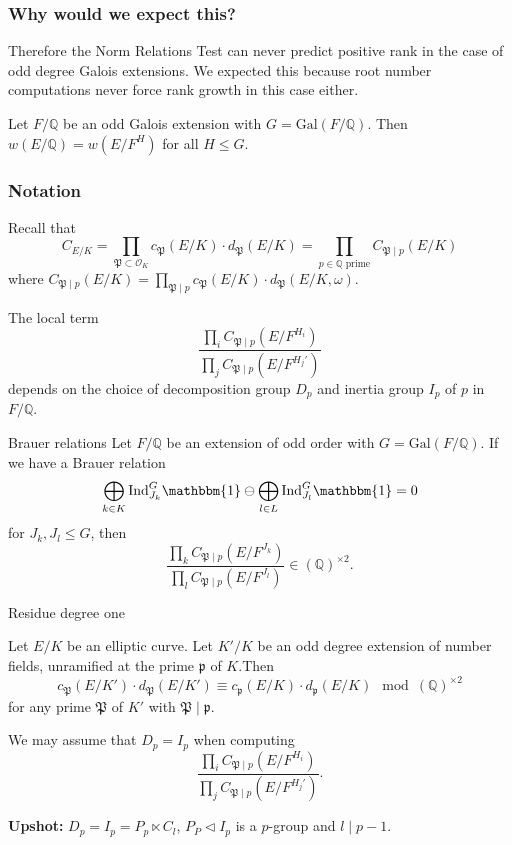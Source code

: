 \documentclass{beamer}
\newcommand{\Gal}{\mathrm{Gal}}
\newcommand{\trivial}{\mathbbm{1}}
\newcommand{\Ind}{\mathrm{Ind}}
\newcommand{\bQ}{\mathbb{Q}}
\newcommand{\fP}{\mathfrak{P}}
\newcommand{\fp}{\mathfrak{p}}
\newcommand{\cO}{\mathcal{O}}
\theoremstyle{plain}
\begin{document}
\begin{frame}
    \frametitle{Why would we expect this?}
        Therefore the Norm Relations Test can never predict positive rank in the case of odd degree Galois extensions. \pause We expected this because root number computations never force rank growth in this case either. \pause
        \begin{lemma}\label{lem_oddroot}
            Let $F / \bQ$ be an odd Galois extension with $G = \Gal(F / \bQ)$. Then $w(E / \bQ) = w(E / F^H)$ for all $H \leq G$. 
        \end{lemma}

\end{frame}

\begin{frame}
    \frametitle{Notation}
    Recall that 
    $$ C_{E / K} = \prod_{\fP \subset \cO_K} 
    c_{\fP}(E / K) \cdot d_{\fP}(E / K) = \prod_{p \in \bQ \text{ prime}} C_{\fP \mid p}(E / K)
    $$
    where $C_{\fP \mid p}(E / K) = \prod_{\fP \mid p} c_{\fP}(E / K) \cdot d_{\fP}(E / K, \omega)$.\pause 

    The local term $$\frac{\prod_i C_{\fP \mid p}(E / F^{H_i})}{\prod_j C_{\fP \mid p}(E / F^{H_j'})}$$ 
    depends on the choice of decomposition group $D_{p}$ and inertia group $I_{p}$ of $p$ in $F / \bQ$.
\end{frame}

\begin{frame}{Brauer relations}
    Let $F / \bQ$ be an extension of odd order with $G = \Gal(F / \bQ)$. \pause 
    If we have a Brauer relation
    \[ \bigoplus_{k \in K} \Ind_{J_k}^G \trivial \ominus \bigoplus_{l \in L} \Ind_{J_l}^G \trivial = 0 \] 
    for $J_k, J_l \leq G$, \pause then 
     $$\frac{\prod_k C_{\fP \mid p}(E / F^{J_k})}{\prod_l C_{\fP \mid p}(E / F^{J_l})} \in (\bQ)^{\times 2}.$$ 
\end{frame}

\begin{frame}{Residue degree one}
    
    \begin{lemma}
       Let $E / K$ be an elliptic curve. Let $K' / K$ be an odd degree extension of number fields, unramified at the prime $\fp$ of $K$.\pause Then 
       \[  c_{\fP}(E / K')\cdot d_{\fP}(E / K') \equiv c_{\fp}(E / K)\cdot d_{\fp}(E / K) \mod (\bQ)^{\times 2} \]
       for any prime $\fP$ of $K'$ with $\fP \mid \fp$.
    \end{lemma}\pause

    \begin{corollary}
        We may assume that $D_p = I_p$ when computing 
        $$\frac{\prod_i C_{\fP \mid p}(E / F^{H_i})}{\prod_j C_{\fP \mid p}(E / F^{H_j'})}.$$ 
    \end{corollary}\pause

    \textbf{Upshot:} $D_p = I_p = P_p \ltimes C_l$, $P_P \triangleleft I_p$ is a $p$-group and $l \mid p - 1$.  
\end{frame}
\end{document}
